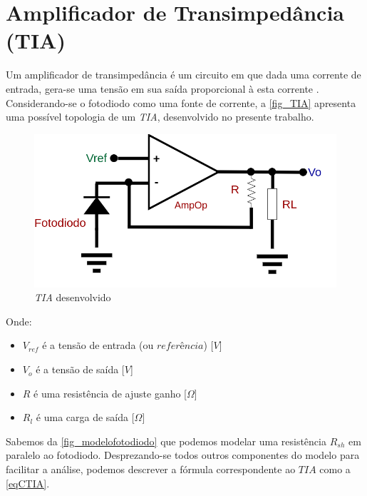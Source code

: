 \section{Amplificador de Transimped\^ancia (TIA)}
\label{section:TIA}

Um amplificador de transimped\^ancia \'e um circuito em que dada uma corrente de entrada, gera-se uma tens\~ao em sua sa\'ida proporcional \`a esta corrente \cite{RazaviFundM}. Considerando-se o fotodiodo como uma fonte de corrente, a \autoref{fig_TIA} apresenta uma poss\'ivel topologia de um \emph{TIA}, desenvolvido no presente trabalho.

\begin{figure}[htb]
	\caption{\label{fig_TIA}\emph{TIA} desenvolvido}
	\begin{center}
	    \includegraphics[scale=0.3]{Circuitos/TIA.png}
	\end{center}
\end{figure}

Onde:

\begin{itemize}
    \item $V_{ref}$ \'e a tens\~ao de entrada (ou $referência$) [$V$]
    \item $V_o$ \'e a tens\~ao de sa\'ida [$V$]
    \item $R$ \'e uma resist\^encia de ajuste ganho [$\Omega$]
    \item $R_l$ \'e uma carga de sa\'ida [$\Omega$]
\end{itemize}

Sabemos da \autoref{fig_modelofotodiodo} que podemos modelar uma resist\^encia $R_{sh}$ em paralelo ao fotodiodo. Desprezando-se todos outros componentes do modelo para facilitar a an\'alise, podemos descrever a f\'ormula correspondente ao $TIA$ como a \autoref{eqCTIA}.

